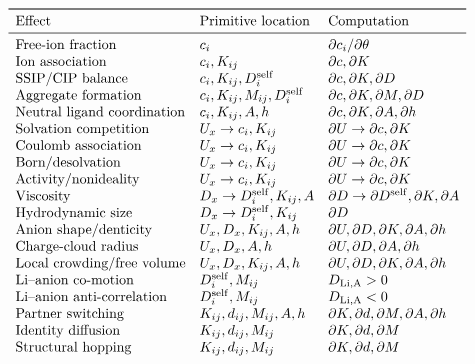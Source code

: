 \documentclass[11pt]{article}
\begin{document}
\[
\begin{array}{lll}
\toprule
\text{Effect} & \text{Primitive location} & \text{Computation}\\
\midrule
\text{Free-ion fraction} & c_i & \partial c_i/\partial\theta\\
\text{Ion association} & c_i,K_{ij} & \partial c,\partial K\\
\text{SSIP/CIP balance} & c_i,K_{ij},D_i^{\rm self} & \partial c,\partial K,\partial D\\
\text{Aggregate formation} & c_i,K_{ij},M_{ij},D_i^{\rm self} & \partial c,\partial K,\partial M,\partial D\\
\text{Neutral ligand coordination} & c_i,K_{ij},A,h & \partial c,\partial K,\partial A,\partial h\\
\text{Solvation competition} & U_x\to c_i,K_{ij} & \partial U\to\partial c,\partial K\\
\text{Coulomb association} & U_x\to c_i,K_{ij} & \partial U\to\partial c,\partial K\\
\text{Born/desolvation} & U_x\to c_i,K_{ij} & \partial U\to\partial c,\partial K\\
\text{Activity/nonideality} & U_x\to c_i,K_{ij} & \partial U\to\partial c,\partial K\\
\text{Viscosity} & D_x\to D_i^{\rm self},K_{ij},A & \partial D\to\partial D^{\rm self},\partial K,\partial A\\
\text{Hydrodynamic size} & D_x\to D_i^{\rm self},K_{ij} & \partial D\\
\text{Anion shape/denticity} & U_x,D_x,K_{ij},A,h & \partial U,\partial D,\partial K,\partial A,\partial h\\
\text{Charge-cloud radius} & U_x,D_x,A,h & \partial U,\partial D,\partial A,\partial h\\
\text{Local crowding/free volume} & U_x,D_x,K_{ij},A,h & \partial U,\partial D,\partial K,\partial A,\partial h\\
\text{Li--anion co-motion} & D_i^{\rm self},M_{ij} & D_{\rm Li,A}>0\\
\text{Li--anion anti-correlation} & D_i^{\rm self},M_{ij} & D_{\rm Li,A}<0\\
\text{Partner switching} & K_{ij},d_{ij},M_{ij},A,h & \partial K,\partial d,\partial M,\partial A,\partial h\\
\text{Identity diffusion} & K_{ij},d_{ij},M_{ij} & \partial K,\partial d,\partial M\\
\text{Structural hopping} & K_{ij},d_{ij},M_{ij} & \partial K,\partial d,\partial M\\

\end{array}\]
\end{document}
